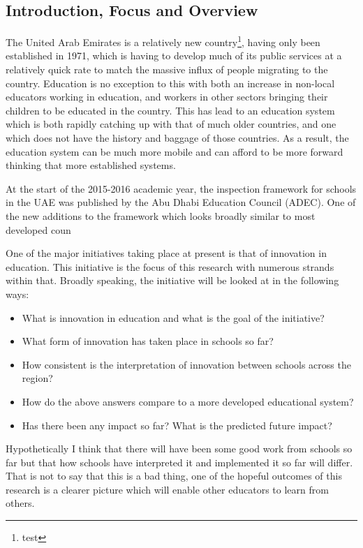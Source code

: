 \subsection{Introduction, Focus and Overview}

The United Arab Emirates is a relatively new country\footnote{test}, having only been established in 1971, which is having to develop much of its public services at a relatively quick rate to match the massive influx of people migrating to the country. Education is no exception to this with both an increase in non-local educators working in education, and workers in other sectors bringing their children to be educated in the country. This has lead to an education system which is both rapidly catching up with that of much older countries, and one which does not have the history and baggage of those countries. As a result, the education system can be much more mobile and can afford to be more forward thinking that more established systems. 

At the start of the 2015-2016 academic year, the inspection framework for schools in the UAE was published by the Abu Dhabi Education Council (ADEC). One of the new additions to the framework which looks broadly similar to most developed coun

One of the major initiatives taking place at present is that of innovation in education. This initiative is the focus of this research with numerous strands within that. Broadly speaking, the initiative will be looked at in the following ways: 

\begin{itemize}
\item What is innovation in education and what is the goal of the initiative?
\item What form of innovation has taken place in schools so far?
\item How consistent is the interpretation of innovation between schools across the region?
\item How do the above answers compare to a more developed educational system?
\item Has there been any impact so far? What is the predicted future impact?

\end{itemize}

Hypothetically I think that there will have been some good work from schools so far but that how schools have interpreted it and implemented it so far will differ. That is not to say that this is a bad thing, one of the hopeful outcomes of this research is a clearer picture which will enable other educators to learn from others.

